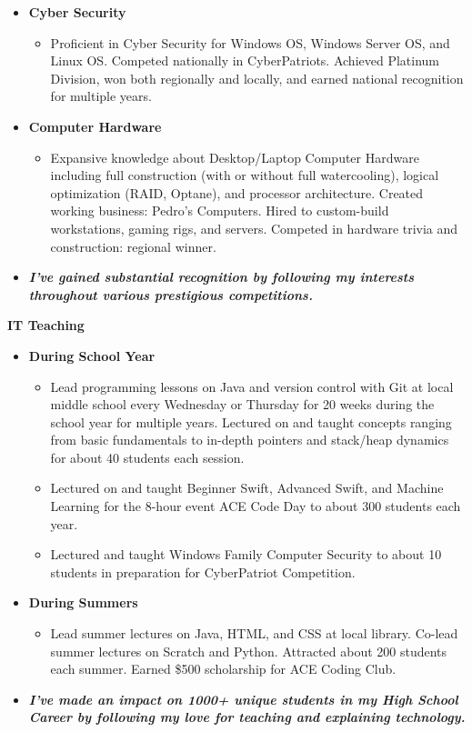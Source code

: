 \documentclass[10pt]{article}
\newenvironment{outerlist}[1][\enskip\textbullet]%
        {\begin{itemize}[#1,leftmargin=*]}{\end{itemize}%
         \vspace{-.6\baselineskip}}
\newenvironment{innerlist}[1][\enskip\textbullet]%
        {\begin{itemize}[#1,leftmargin=*,parsep=0pt,itemsep=0pt,topsep=0pt,partopsep=0pt]}
        {\end{itemize}}
\begin{document}
\begin{outerlist}
\item[] \textbf{Cyber Security}
\begin{innerlist}
\item[] Proficient in Cyber Security for Windows OS, Windows Server OS, and Linux OS. Competed nationally in CyberPatriots. Achieved Platinum Division, won both regionally and locally, and earned national recognition for multiple years. 
\end{innerlist}
\item[]  \textbf{Computer Hardware}
\begin{innerlist}
\item[] Expansive knowledge about Desktop/Laptop Computer Hardware including full construction (with or without full watercooling), logical optimization (RAID, Optane), and processor architecture. Created working business: Pedro's Computers. Hired to custom-build workstations, gaming rigs, and servers. Competed in hardware trivia and construction: regional winner.
\end{innerlist}
\item[] \textbf{\emph{I've gained substantial recognition by following my interests throughout various prestigious competitions.}}
\end{outerlist}
\vspace{.1in}
\textbf{IT Teaching}
\begin{outerlist}
\item[] \textbf{During School Year}
\begin{innerlist}
\item[] Lead programming lessons on Java and version control with Git at local middle school every Wednesday or Thursday for 20 weeks during the school year for multiple years. Lectured on and taught concepts ranging from basic fundamentals to in-depth pointers and stack/heap dynamics for about 40 students each session. 
\vspace{.1in}
\item[] Lectured on and taught Beginner Swift, Advanced Swift, and Machine Learning for the 8-hour event ACE Code Day to about 300 students each year.
\vspace{.1in}
\item[] Lectured and taught Windows Family Computer Security to about 10 students in preparation for CyberPatriot Competition.
\end{innerlist}
\item[] \textbf{During Summers}
\begin{innerlist}
\item[] Lead summer lectures on Java, HTML, and CSS at local library. Co-lead summer lectures on Scratch and Python. Attracted about 200 students each summer. Earned \$500 scholarship for ACE Coding Club. 
\end{innerlist}
\item[] \textbf{\emph{I've made an impact on 1000+ unique students in my High School Career by following my love for teaching and explaining technology.}}
\end{outerlist}
\end{document}
